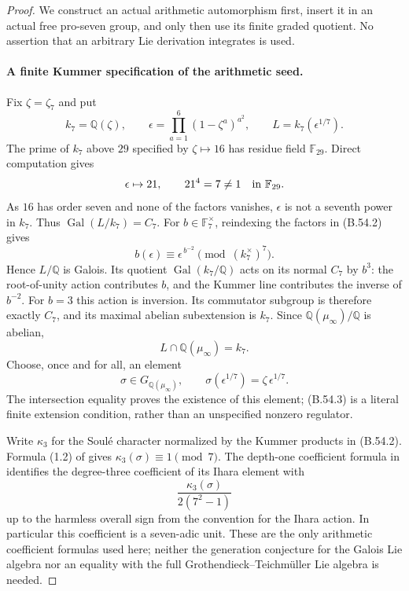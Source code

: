 \begin{proof}
We construct an actual arithmetic automorphism first, insert
it in an actual free pro-seven group, and only then use its
finite graded quotient. No assertion that an arbitrary Lie
derivation integrates is used.

\paragraph{A finite Kummer specification of the arithmetic seed.}
Fix $\zeta=\zeta_7$ and put
\[
 k_7=\mathbb Q(\zeta),\qquad
 \epsilon=\prod_{a=1}^6(1-\zeta^a)^{a^2},\qquad
 L=k_7(\epsilon^{1/7}).                                    \tag{B.54.2}
\]
The prime of $k_7$ above $29$ specified by $\zeta\mapsto16$
has residue field $\mathbb F_{29}$. Direct computation gives
\[
             \epsilon\mapsto21,\qquad21^4=7\ne1
                           \quad\hbox{in }\mathbb F_{29}.
\]
As $16$ has order seven and none of the factors vanishes,
$\epsilon$ is not a seventh power in $k_7$. Thus
$\operatorname{Gal}(L/k_7)=C_7$.
For $b\in\mathbb F_7^\times$, reindexing the factors in
(B.54.2) gives
\[
             b(\epsilon)\equiv\epsilon^{\,b^{-2}}
                              \pmod{(k_7^\times)^7}.
\]
Hence $L/\mathbb Q$ is Galois. Its quotient
$\operatorname{Gal}(k_7/\mathbb Q)$ acts on its normal $C_7$
by $b^3$: the root-of-unity action contributes $b$, and the
Kummer line contributes the inverse of $b^{-2}$.
For $b=3$ this action is inversion. Its commutator subgroup
is therefore exactly $C_7$, and its maximal abelian
subextension is $k_7$. Since $\mathbb Q(\mu_\infty)/\mathbb Q$
is abelian,
\[
                 L\cap\mathbb Q(\mu_\infty)=k_7.
\]
Choose, once and for all, an element
\[
 \sigma\in G_{\mathbb Q(\mu_\infty)},\qquad
 \sigma(\epsilon^{1/7})=\zeta\,\epsilon^{1/7}.               \tag{B.54.3}
\]
The intersection equality proves the existence of this
element; (B.54.3) is a literal finite extension condition,
rather than an unspecified nonzero regulator.

Write $\kappa_3$ for the Soul\'e character normalized by the
Kummer products in (B.54.2). Formula (1.2) of
\cite[pp.~55--56]{CENakamuraSakugawaWojtkowiak2017} gives
$\kappa_3(\sigma)\equiv1\pmod7$.
The depth-one coefficient formula in
\cite[\S5, pp.~718--719]{CEFurusho2003} identifies the
degree-three coefficient of its Ihara element with
\[
             \frac{\kappa_3(\sigma)}{2(7^2-1)}
\]
up to the harmless overall sign from the convention for the
Ihara action. In particular this coefficient is a
seven-adic unit. These are the only arithmetic coefficient
formulas used here; neither the generation conjecture for
the Galois Lie algebra nor an equality with the full
Grothendieck--Teichm\"uller Lie algebra is needed.


\end{proof}
